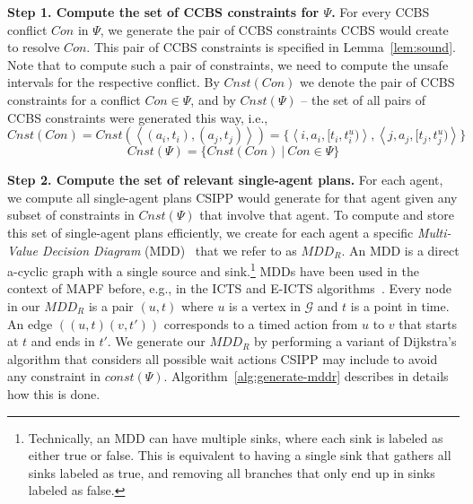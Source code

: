 \documentclass[review]{elsarticle}
\newcommand{\tuple}[1]{\ensuremath{\left \langle #1 \right \rangle }}
\newcommand{\mddr}{\ensuremath{MDD_R}\xspace}
\newcommand\konstantin[1]{\nb{\textbf{Konstantin:}}{red}{#1}}
\newcommand{\ccbs}{\ac{CCBS}\xspace}
\newcommand{\csipp}{\ac{CSIPP}\xspace}
\newcommand{\mapf}{\ac{MAPF}\xspace}
\newcommand{\const}{\textit{const}\xspace}
\begin{document}
\textbf{Step 1. Compute the set of \ccbs constraints for $\Psi$.}
For every \ccbs conflict $Con$ in $\Psi$, we generate the pair of \ccbs constraints \ccbs would create to resolve $Con$. 
This pair of \ccbs constraints is specified in Lemma~\ref{lem:sound}. 
Note that to compute such a pair of constraints, we need to compute the unsafe intervals for the respective conflict. 
By $Cnst(Con)$ we denote the pair of \ccbs constraints for a conflict $Con\in \Psi$, 
and by $Cnst(\Psi)$ -- the set of all pairs of \ccbs constraints were generated this way, i.e., 
\begin{equation}
Cnst(Con) = Cnst(\tuple{ (a_i, t_i), (a_j,t_j) }) = \{ \tuple{i, a_i, [t_i, t_i^u)}, \tuple{j, a_j, [t_j, t_j^u)} \}
\end{equation}
\begin{equation}
Cnst(\Psi) = \{ Cnst(Con)~|~Con\in \Psi\} 
\end{equation}



\textbf{Step 2. Compute the set of relevant single-agent plans.}
For each agent, we compute all single-agent plans \csipp would generate for that agent given any subset of constraints in $Cnst(\Psi)$ that involve that agent. 
To compute and store this set of single-agent plans efficiently, we create for each agent a 
specific \emph{Multi-Value Decision Diagram} (MDD)~\cite{srinivasan1990algorithms} that we refer to as \mddr. 
An MDD is a direct a-cyclic graph with a single source and sink.\footnote{Technically, an MDD can have multiple sinks, where each sink is labeled as either true or false. This is equivalent to having a single sink that gathers all sinks labeled as true, and removing all branches that only end up in sinks labeled as false.}
MDDs have been used in the context of \mapf before, e.g., in the ICTS and E-ICTS algorithms~\cite{sharon2013increasing,walker2018extended}. 
Every node in our \mddr is a pair $(u,t)$ where $u$ is a vertex in $\mathcal{G}$ 
and $t$ is a point in time. 
An edge $((u,t)(v,t'))$ corresponds to a timed action from $u$ to $v$ that starts at $t$ and ends in $t'$. We generate our \mddr by performing a variant of Dijkstra's algorithm that considers all possible wait actions \csipp may include to avoid any constraint in $\const(\Psi)$. 
Algorithm~\ref{alg:generate-mddr} describes in details how this is done. 
\end{document}
